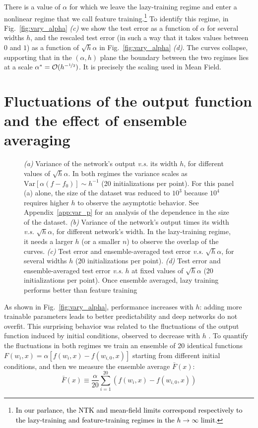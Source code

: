 \documentclass{article}
\newcommand{\mm}[1]{\textcolor{black}{#1}}
\renewcommand{\cite}[1]{\citep{#1}}
\newcommand{\mc}{\mathcal}
\newcommand{\mr}{\mathrm}
\newcommand{\aref}[1]{Appendix~\ref{#1}}
\newcommand{\fref}[1]{Fig.~\ref{#1}}
\begin{document}
There is a value of $\alpha$ for which we leave the lazy-training regime and enter a nonlinear regime that we call feature training.\footnote{\mm{In our parlance, the NTK and mean-field limits correspond respectively to the lazy-training and feature-training regimes in the $h\to\infty$ limit.}}
To identify this regime, in \fref{fig:vary_alpha} \emph{(c)} we show the test error as a function of $\alpha$ for several widths $h$, and the rescaled test error (in such a way that it takes values between $0$ and $1$) as a function  of $\sqrt{h}\alpha$ in \fref{fig:vary_alpha} \emph{(d)}. The curves collapse, supporting that in the $(\alpha,h)$ plane the boundary between the two regimes lies at a scale $\alpha^* = \mc O(h^{-\nicefrac12})$. It is precisely the scaling used in Mean Field. 





\section{Fluctuations of the output function and the effect of ensemble averaging}\label{sec:fluctuations}

\begin{figure}[th!]
    \centering
    \caption{\emph{(a)} Variance of the network's output \textit{v.s.} its width $h$, for different values of $\sqrt{h}\alpha$. In both regimes the variance scales as $\mr{Var}[ \alpha(f-f_0)] \sim h^{-1}$ (20 initializations per point). For this panel (a) alone, the size of the dataset was reduced to $10^3$ because $10^4$ requires higher $h$ to observe the asymptotic behavior. See \aref{app:var_p} for an analysis of the dependence in the size of the dataset. \emph{(b)} Variance of the network's output times its width \textit{v.s.} $\sqrt{h}\alpha$, for different network's width. In the lazy-training regime, it needs a larger $h$ (or a smaller $n$) to observe the overlap of the curves. \emph{(c)} Test error and ensemble-averaged test error \textit{v.s.} $\sqrt{h}\alpha$, for several widths $h$ (20 initializations per point). \emph{(d)} Test error and ensemble-averaged test error \textit{v.s.} $h$ at fixed values of $\sqrt{h}\alpha$ (20 initializations per point). Once ensemble averaged, lazy training performs better than feature training \label{fig:var_ens}}
\end{figure}

As shown in \fref{fig:vary_alpha}, performance increases with $h$: adding more trainable parameters leads to better predictability and deep networks do not overfit. This surprising behavior was related to the fluctuations of the output function  induced by initial conditions, observed to decrease with $h$ \cite{neal2018modern,geiger2019scaling}. To quantify the fluctuations in both regimes we train an ensemble of 20 identical functions $F(w_i,x) = \alpha \left[ f(w_i,x) - f(w_{i,0},x) \right]$ starting from different initial conditions, and then we measure the ensemble average $\bar F(x)$:
\begin{equation}
\bar F(x) \equiv \frac\alpha{20} \sum_{i=1}^{20} (f(w_i,x) - f(w_{i,0},x))
\end{equation}
\end{document}
